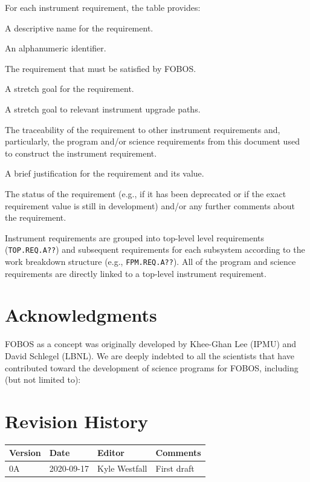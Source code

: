 \documentclass[11pt,a4paper,twoside,onecolumn,openany,final,oldfontcommands]{memoir}
\begin{document}
For each instrument requirement, the table provides:
%
\begin{description}[itemindent=0pt, itemsep=2pt, parsep=0pt]
\item[Description] A descriptive name for the requirement.
\item[ID] An alphanumeric identifier.
\item[Requirement] The requirement that must be satisfied by FOBOS.
\item[Goal] A stretch goal for the requirement.
\item[2nd Light Goal] A stretch goal to relevant instrument upgrade paths.
\item[Derived From] The traceability of the requirement to other instrument requirements and, particularly, the program and/or science requirements from this document used to construct the instrument requirement.
\item[Justification] A brief justification for the requirement and its value.
\item[Status/Comments] The status of the requirement (e.g., if it has been deprecated or if the exact requirement value is still in development) and/or any further comments about the requirement.
\end{description}

Instrument requirements are grouped into top-level level requirements (\texttt{TOP.REQ.A??}) and subsequent requirements for each subsystem according to the work breakdown structure (e.g., \texttt{FPM.REQ.A??}).  All of the program and science requirements are directly linked to a top-level instrument requirement.


\chapter*{Acknowledgments}

FOBOS as a concept was originally developed by Khee-Ghan Lee (IPMU) and David Schlegel (LBNL).  We are deeply indebted to all the scientists that have contributed toward the development of science programs for FOBOS, including (but not limited to): 


\chapter*{Revision History}

\begin{table}[hp]{%
\begin{tabular}{l | l | l |  p{22pc}} \toprule
\textbf{Version} & \textbf{Date} & \textbf{Editor} & \textbf{Comments} \\ \midrule
0A & 2020-09-17 & Kyle Westfall & First draft \\ \bottomrule
\end{tabular}}
\end{table}



\end{document}
